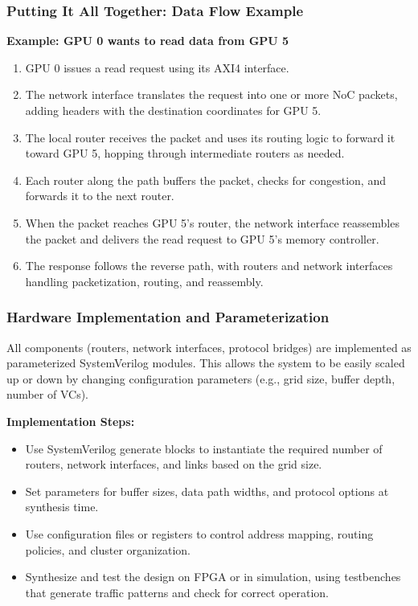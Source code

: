 \documentclass[11pt,a4paper]{article}
\begin{document}
\subsubsection{Putting It All Together: Data Flow Example}
\textbf{Example: GPU 0 wants to read data from GPU 5}
\begin{enumerate}
    \item GPU 0 issues a read request using its AXI4 interface.
    \item The network interface translates the request into one or more NoC packets, adding headers with the destination coordinates for GPU 5.
    \item The local router receives the packet and uses its routing logic to forward it toward GPU 5, hopping through intermediate routers as needed.
    \item Each router along the path buffers the packet, checks for congestion, and forwards it to the next router.
    \item When the packet reaches GPU 5's router, the network interface reassembles the packet and delivers the read request to GPU 5's memory controller.
    \item The response follows the reverse path, with routers and network interfaces handling packetization, routing, and reassembly.
\end{enumerate}

\subsubsection{Hardware Implementation and Parameterization}
All components (routers, network interfaces, protocol bridges) are implemented as parameterized SystemVerilog modules. This allows the system to be easily scaled up or down by changing configuration parameters (e.g., grid size, buffer depth, number of VCs).

\textbf{Implementation Steps:}
\begin{itemize}
    \item Use SystemVerilog generate blocks to instantiate the required number of routers, network interfaces, and links based on the grid size.
    \item Set parameters for buffer sizes, data path widths, and protocol options at synthesis time.
    \item Use configuration files or registers to control address mapping, routing policies, and cluster organization.
    \item Synthesize and test the design on FPGA or in simulation, using testbenches that generate traffic patterns and check for correct operation.
\end{itemize}
\end{document}
